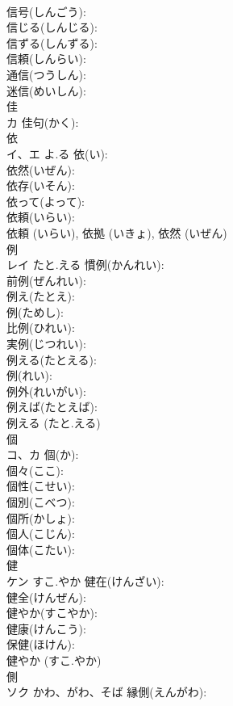 \documentclass[8pt]{extreport}
\begin{document}
\begin{CJK}{UTF8}{min}
\\	信号(しんごう): 
\\	信じる(しんじる): 
\\	信ずる(しんずる): 
\\	信頼(しんらい): 
\\	通信(つうしん): 
\\	迷信(めいしん): 
\\	佳			
\\	カ		佳句(かく): 
\\	依			
\\	イ、エ	よ.る	依(い): 
\\	依然(いぜん): 
\\	依存(いそん): 
\\	依って(よって): 
\\	依頼(いらい): 
\\	依頼 (いらい), 依拠 (いきょ), 依然 (いぜん)
\\	例			
\\	レイ	たと.える	慣例(かんれい): 
\\	前例(ぜんれい): 
\\	例え(たとえ): 
\\	例(ためし): 
\\	比例(ひれい): 
\\	実例(じつれい): 
\\	例える(たとえる): 
\\	例(れい): 
\\	例外(れいがい): 
\\	例えば(たとえば): 
\\	例える (たと.える)
\\	個			
\\	コ、カ		個(か): 
\\	個々(ここ): 
\\	個性(こせい): 
\\	個別(こべつ): 
\\	個所(かしょ): 
\\	個人(こじん): 
\\	個体(こたい): 
\\	健			
\\	ケン	すこ.やか	健在(けんざい): 
\\	健全(けんぜん): 
\\	健やか(すこやか): 
\\	健康(けんこう): 
\\	保健(ほけん): 
\\	健やか (すこ.やか)
\\	側			
\\	ソク	かわ、がわ、そば	縁側(えんがわ): 

\end{CJK}
\end{document}
